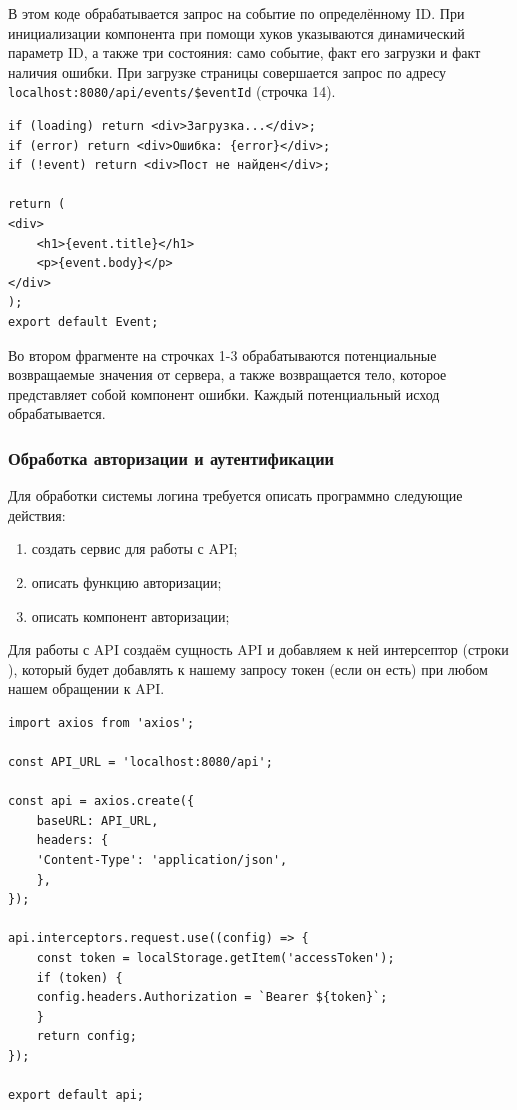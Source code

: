 \documentclass[diploma]{SCWorks}
\begin{document}
В этом коде обрабатывается запрос на событие по определённому ID. При 
инициализации компонента при помощи хуков указываются динамический параметр ID, 
а также три состояния: само событие, факт его загрузки и факт наличия ошибки.
При загрузке страницы совершается запрос по адресу 
\texttt{localhost:8080/api/events/\${eventId}} (строчка 14). 

\begin{verbatim}
if (loading) return <div>Загрузка...</div>;
if (error) return <div>Ошибка: {error}</div>;
if (!event) return <div>Пост не найден</div>;

return (
<div>
    <h1>{event.title}</h1>
    <p>{event.body}</p>
</div>
);
export default Event;
\end{verbatim}

Во втором фрагменте на строчках 1-3 обрабатываются потенциальные 
возвращаемые значения от сервера, а также возвращается тело, которое 
представляет собой компонент ошибки. Каждый потенциальный исход обрабатывается.

\subsubsection{Обработка авторизации и аутентификации}

Для обработки системы логина требуется описать программно следующие действия:
\begin{enumerate}
    \item создать сервис для работы с API; %
    \item описать функцию авторизации; %
    \item описать компонент авторизации; %
\end{enumerate}

Для работы с API создаём сущность API и добавляем к ней интерсептор 
(строки ), который
будет добавлять к нашему запросу токен (если он есть) при любом нашем обращении
к API.

\begin{verbatim}
import axios from 'axios';

const API_URL = 'localhost:8080/api';

const api = axios.create({
    baseURL: API_URL,
    headers: {
    'Content-Type': 'application/json',
    },
});

api.interceptors.request.use((config) => {
    const token = localStorage.getItem('accessToken');
    if (token) {
    config.headers.Authorization = `Bearer ${token}`;
    }
    return config;
});

export default api;    
\end{verbatim}
\end{document}
